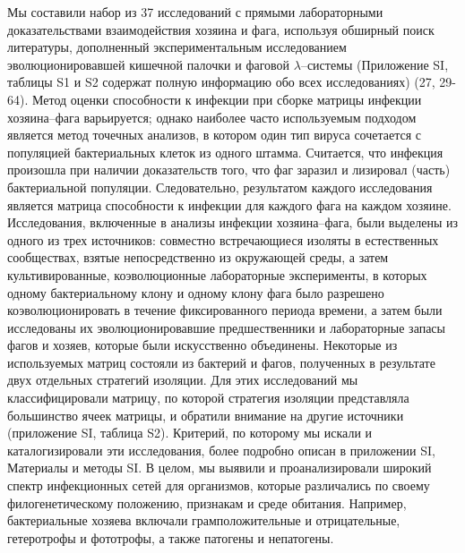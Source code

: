 \documentclass[a4paper,12pt]{article}
\begin{document}
    \par{Мы составили набор из 37 исследований с прямыми лабораторными доказательствами взаимодействия хозяина и фага,
    используя обширный поиск литературы, дополненный экспериментальным исследованием эволюционировавшей кишечной
    палочки и фаговой $\lambda$–системы (Приложение SI, таблицы S1 и S2 содержат полную информацию обо всех
    исследованиях) (27, 29-64). Метод оценки способности к инфекции при сборке матрицы инфекции хозяина–фага
    варьируется; однако наиболее часто используемым подходом является метод точечных анализов, в котором один тип
    вируса сочетается с популяцией бактериальных клеток из одного штамма. Считается, что инфекция произошла при наличии
    доказательств того, что фаг заразил и лизировал (часть) бактериальной популяции. Следовательно, результатом каждого
    исследования является матрица способности к инфекции для каждого фага на каждом хозяине. Исследования, включенные в
    анализы инфекции хозяина–фага, были выделены из одного из трех источников: совместно встречающиеся изоляты в
    естественных сообществах, взятые непосредственно из окружающей среды, а затем культивированные, коэволюционные
    лабораторные эксперименты, в которых одному бактериальному клону и одному клону фага было разрешено
    коэволюционировать в течение фиксированного периода времени, а затем были исследованы их эволюционировавшие
    предшественники и лабораторные запасы фагов и хозяев, которые были искусственно объединены. Некоторые из
    используемых матриц состояли из бактерий и фагов, полученных в результате двух отдельных стратегий изоляции. Для
    этих исследований мы классифицировали матрицу, по которой стратегия изоляции представляла большинство ячеек
    матрицы, и обратили внимание на другие источники (приложение SI, таблица S2). Критерий, по которому мы искали и
    каталогизировали эти исследования, более подробно описан в приложении SI, Материалы и методы SI. В целом, мы
    выявили и проанализировали широкий спектр инфекционных сетей для организмов, которые различались по своему
    филогенетическому положению, признакам и среде обитания. Например, бактериальные хозяева включали грамположительные
    и отрицательные, гетеротрофы и фототрофы, а также патогены и непатогены.}
    
\end{document}
